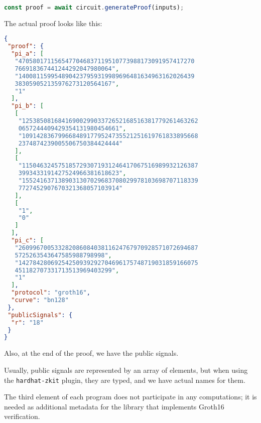 \documentclass[../lecture-notes.tex]{subfiles}
\begin{document}
    \begin{lstlisting}[language=TypeScript,numbers=none]
    const proof = await circuit.generateProof(inputs);
    \end{lstlisting}

    The actual proof looks like this:
    \begin{center}
        \begin{tcolorbox}[enhanced,
            width=0.925\textwidth,
            title=\textbf{proof.json},
            coltitle=gray!25!black,
            attach boxed title to top center={yshift=-2mm,yshifttext=-1mm},
            boxed title style={size=small,colframe=gray!75!black,
            colback=purple!30!white,boxrule=1pt},
            top=-0.35cm,
            bottom=-0.35cm]
            \begin{lstlisting}[language=JSON,numbers=none,basicstyle=\ttfamily\scriptsize]
{
 "proof": {
  "pi_a": [
   "4705801711565477046837119510773988173091957417270
   766918367441244292047980064",
   "1400811599548904237959319989696481634963162026439
   383059052135976273120564167",
   "1"
  ],
  "pi_b": [
   [
    "1253850816841690029903372652168516381779261463262
    0657244409429354131980454661",
    "1091428367996684891779524735521251619761833895668
    2374874239005506750384424444"
   ],
   [
    "1150463245751857293071931246417067516989932126387
    3993433191427524966381618623",
    "1552416371389031307029683708029978103698707118339
    7727452907670321368057103914"
   ],
   [
    "1",
    "0"
   ]
  ],
  "pi_c": [
   "26099670053328208608403811624767970928571072694687
   5725263543647585988798998",
   "14278428069254250939292704696175748719031859166075
   451182707331713513969403299",
   "1"
  ],
  "protocol": "groth16",
  "curve": "bn128"
 },
 "publicSignals": {
  "r": "18"
 }
}
            \end{lstlisting}
        \end{tcolorbox}
    \end{center}

    Also, at the end of the proof, we have the public signals.

    \begin{remark}
        Usually, public signals are represented by an array of elements, but when using the \texttt{hardhat-zkit} plugin,
        they are typed, and we have actual names for them.
    \end{remark}

    The third element of each program does not participate in any computations; it is needed as additional metadata for the library that implements Groth16 verification.
\end{document}
